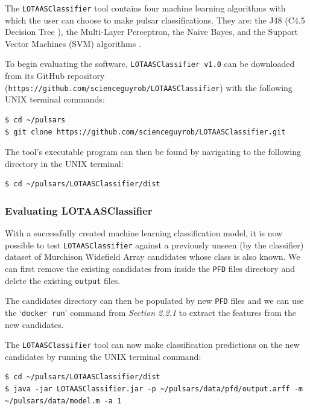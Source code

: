 \documentclass{article}
\begin{document}
The \verb|LOTAASClassifier| tool contains four machine learning algorithms with which the user can choose to make pulsar classifications. They are: the J48 (C4.5 Decision Tree \autocite{quinlan}), the Multi-Layer Perceptron, the Naive Bayes, and the Support Vector Machines (SVM) algorithms \autocite{lyon}.

To begin evaluating the software, \verb|LOTAASClassifier v1.0| can be downloaded from its GitHub repository \\(\verb|https://github.com/scienceguyrob/LOTAASClassifier|) with the following UNIX terminal commands:

\begin{lstlisting}[numbers=none]
$ cd ~/pulsars
$ git clone https://github.com/scienceguyrob/LOTAASClassifier.git
\end{lstlisting}

The tool's executable program can then be found by navigating to the following directory in the UNIX terminal:

\begin{lstlisting}[numbers=none]
$ cd ~/pulsars/LOTAASClassifier/dist
\end{lstlisting}

\subsubsection{Evaluating LOTAASClassifier}

With a successfully created machine learning classification model, it is now possible to test \verb|LOTAASClassifier| against a previously unseen (by the classifier) dataset of Murchison Widefield Array candidates whose class is also known. We can first remove the existing candidates from inside the \verb|PFD| files directory and delete the existing \verb|output| files.

The candidates directory can then be populated by new \verb|PFD| files and we can use the `\verb|docker run|' command from \emph{Section 2.2.1} to extract the features from the new candidates.

The \verb|LOTAASClassifier| tool can now make classification predictions on the new candidates by running the UNIX terminal command:

\begin{lstlisting}[numbers=none]
$ cd ~/pulsars/LOTAASClassifier/dist
$ java -jar LOTAASClassifier.jar -p ~/pulsars/data/pfd/output.arff -m ~/pulsars/data/model.m -a 1
\end{lstlisting}
\end{document}
